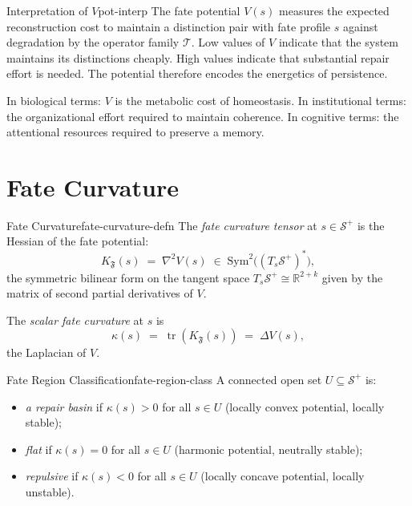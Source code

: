 \documentclass[12pt,twoside,openright]{book}
\newcommand{\transfam}{\mathcal{T}}       %
\newcommand{\fateMap}{\mathfrak{F}}
\newcommand{\fateSpace}{\mathcal{S}}
\providecommand{\fatePos}{\fateSpace^{+}}
\providecommand{\fatePot}{V}
\providecommand{\fateKurv}{K_{\fateMap}}
\providecommand{\fateTan}[1]{T_{#1}\fatePos}
\begin{document}
\begin{remark}{Interpretation of $\fatePot$}{pot-interp}
The fate potential $\fatePot(s)$ measures the expected
reconstruction cost to maintain a distinction pair with fate
profile $s$ against degradation by the operator family
$\transfam$. Low values of $\fatePot$ indicate that the system
maintains its distinctions cheaply. High values indicate that
substantial repair effort is needed. The potential therefore
encodes the energetics of persistence.

In biological terms: $\fatePot$ is the metabolic cost of
homeostasis. In institutional terms: the organizational effort
required to maintain coherence. In cognitive terms: the
attentional resources required to preserve a memory.
\end{remark}

\section{Fate Curvature}

\begin{definition}{Fate Curvature}{fate-curvature-defn}
The \emph{fate curvature tensor} at $s\in\fatePos$ is the
Hessian of the fate potential:
\[
  \fateKurv(s)
  \;=\;
  \nabla^2 \fatePot(s)
  \;\in\;
  \mathrm{Sym}^2\bigl((\fateTan{s})^*\bigr),
\]
the symmetric bilinear form on the tangent space
$\fateTan{s}\cong\mathbb{R}^{2+k}$ given by the matrix of
second partial derivatives of $\fatePot$.

The \emph{scalar fate curvature} at $s$ is
\[
  \kappa(s) \;=\; \operatorname{tr}(\fateKurv(s))
  \;=\; \Delta \fatePot(s),
\]
the Laplacian of $\fatePot$.
\end{definition}

\begin{definition}{Fate Region Classification}{fate-region-class}
A connected open set $U\subseteq\fatePos$ is:
\begin{itemize}[nosep,leftmargin=2em]
  \item \emph{a repair basin} if $\kappa(s)>0$ for all
    $s\in U$ (locally convex potential, locally stable);
  \item \emph{flat} if $\kappa(s)=0$ for all $s\in U$
    (harmonic potential, neutrally stable);
  \item \emph{repulsive} if $\kappa(s)<0$ for all $s\in U$
    (locally concave potential, locally unstable).
\end{itemize}
\end{definition}
\end{document}
